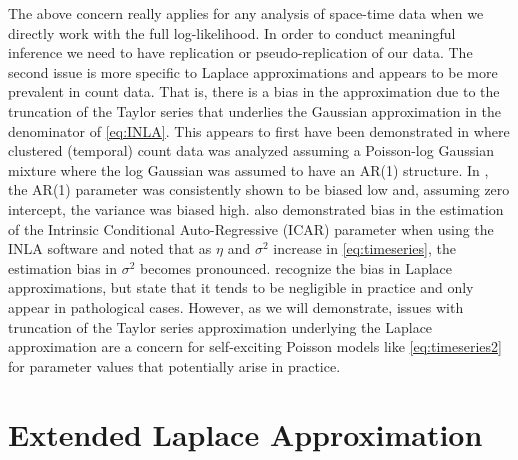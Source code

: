\documentclass[11pt]{isuthesis}
\begin{document}
	The above concern really applies for any analysis of space-time data when we directly work with the full log-likelihood.  In order to conduct meaningful inference we need to have replication or pseudo-replication of our data.  The second issue is more specific to Laplace approximations and appears to be more prevalent in count data.  That is, there is a bias in the approximation due to the truncation of the Taylor series that underlies the Gaussian approximation in the denominator of \eqref{eq:INLA}.   This appears to first have been demonstrated in \cite{joe2008accuracy} where clustered (temporal) count data was analyzed assuming a Poisson-log Gaussian mixture where the log Gaussian was assumed to have an AR(1) structure.  In \cite{joe2008accuracy}, the AR(1) parameter was consistently shown to be biased low and, assuming zero intercept, the variance was biased high.  \cite{carroll2015comparing} also demonstrated bias in the estimation of the Intrinsic Conditional Auto-Regressive (ICAR) parameter when using the INLA software and \cite{2017arXiv170308429C} noted that as $\eta$ and $\sigma^2$ increase in \eqref{eq:timeseries}, the estimation bias in $\sigma^2$ becomes pronounced.  \cite{rue2009approximate} recognize the bias in Laplace approximations, but state that it tends to be negligible in practice and only appear in pathological cases.  However, as we will demonstrate, issues with truncation of the Taylor series approximation underlying the Laplace approximation are a concern for self-exciting Poisson models like \eqref{eq:timeseries2} for parameter values that potentially arise in practice.
	
	\section{Extended Laplace Approximation}
	
\end{document}
